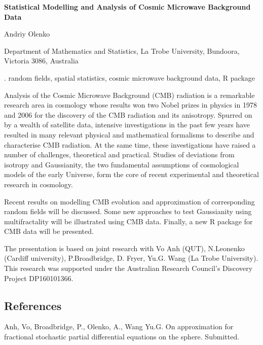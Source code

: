 \documentclass[12pt]{article}
\begin{document}
\begin{flushleft}


{\LARGE\bf Statistical Modelling and Analysis of Cosmic Microwave Background Data}


\vspace{1.0cm}

Andriy Olenko 

\begin{description}

\item Department of Mathematics and Statistics, La Trobe University, Bundoora, Victoria 3086, Australia

\end{description}

\end{flushleft}


\vspace{0.75cm}


.
random fields, spatial statistics, cosmic microwave background data, R package

\vspace{1.0cm}

Analysis of the Cosmic Microwave Background
(CMB) radiation is a remarkable research area in cosmology whose results won
two Nobel prizes in physics in 1978 and 2006 for the discovery of the CMB
radiation and its anisotropy. Spurred on by a wealth of satellite data,
intensive investigations in the past few years have resulted in many
relevant physical and mathematical formalisms to describe and characterise
CMB radiation. At the same time, these investigations have raised a number
of challenges, theoretical and practical.  
Studies of deviations from isotropy and Gaussianity, the two
	fundamental assumptions of cosmological models of the early Universe, form
	the core of recent experimental and theoretical research in cosmology.

Recent results on modelling CMB evolution and approximation of corresponding random fields will be discussed. Some new approaches to test Gaussianity using multifractality will be illustrated using CMB data. Finally, a new R package for CMB data will be presented.
  
The presentation is based on joint research with Vo Anh (QUT), N.Leonenko (Cardiff university), P.Broadbridge, D. Fryer, Yu.G. Wang (La Trobe University). This research was supported under the Australian Research Council's Discovery Project DP160101366.

\subsection*{References}

\begin{description}

\item
Anh, Vo,  Broadbridge, P., Olenko, A., Wang Yu.G. On approximation for fractional stochastic partial differential equations on the sphere. Submitted.

\end{description}
\end{document}

